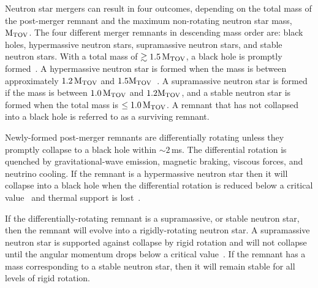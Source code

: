 \documentclass[../Thesis.tex]{subfiles}
\begin{document}
    Neutron star mergers can result in four outcomes, depending on the total mass of the post-merger remnant and the maximum non-rotating neutron star mass, $\mathrm{M_{TOV}}$.
    The four different merger remnants in descending mass order are: black holes, hypermassive neutron stars, supramassive neutron stars, and stable neutron stars.
    With a total mass of $\gtrsim 1.5\,\mathrm{M_{TOV}}$, a black hole is promptly formed~\cite{Weih2018}.
    A hypermassive neutron star is formed when the mass is between approximately $1.2\,\mathrm{M_{TOV}}$ and $1.5\mathrm{M_{TOV}}$~\cite{Breu2016,Weih2018}.
    A supramassive neutron star is formed if the mass is between $1.0\,\mathrm{M_{TOV}}$ and $1.2\mathrm{M_{TOV}}$, and a stable neutron star is formed when the total mass is $\leq 1.0\,\mathrm{M_{TOV}}$.
    A remnant that has not collapsed into a black hole is referred to as a surviving remnant.\par
    
    Newly-formed post-merger remnants are differentially rotating unless they promptly collapse to a black hole within $\sim 2\,$ms.
    The differential rotation is quenched by gravitational-wave emission, magnetic braking, viscous forces, and neutrino cooling.
    If the remnant is a hypermassive neutron star then it will collapse into a black hole when the differential rotation is reduced below a critical value~\cite{Weih2018} and thermal support is lost~\cite[e.g.,][]{Bauswein2010,Kaplan2014}.  \par
    
    If the differentially-rotating remnant is a supramassive, or stable neutron star, then the remnant will evolve into a rigidly-rotating neutron star.
    A supramassive neutron star is supported against collapse by rigid rotation and will not collapse until the angular momentum drops below a critical value~\cite{Breu2016}.
    If the remnant has a mass corresponding to a stable neutron star, then it will remain stable for all levels of rigid rotation.\par
    
\end{document}
